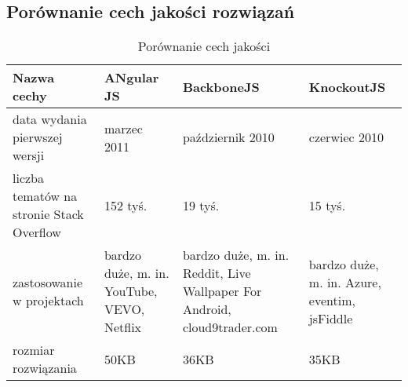 \subsection{Porównanie cech jakości rozwiązań}
 \begin{table}[h]
	\caption{Porównanie cech jakości}
	\label{tab:heading-styles}
	\begin{tabularx}{\textwidth}{|X|X|X|X|}
		\hline
		Nazwa cechy						& ANgular JS 	&  BackboneJS & KnockoutJS	\\ 
		\hline
		data wydania pierwszej wersji 		& marzec 2011 & październik 2010 & czerwiec 2010 	\\  
		\hline
		liczba tematów na stronie Stack Overflow \cite{stack-overflow}	& 152 tyś. & 19 tyś. & 15 tyś. \\ 
		\hline
		zastosowanie w projektach & bardzo duże, m. in. YouTube, VEVO, Netflix & bardzo duże, m. in. Reddit, Live Wallpaper For Android, cloud9trader.com  & bardzo duże, m. in. Azure, eventim, jsFiddle \\ 
		\hline
		rozmiar rozwiązania					& 50KB  & 36KB & 35KB\\
		\hline
	\end{tabularx}
\end{table}
